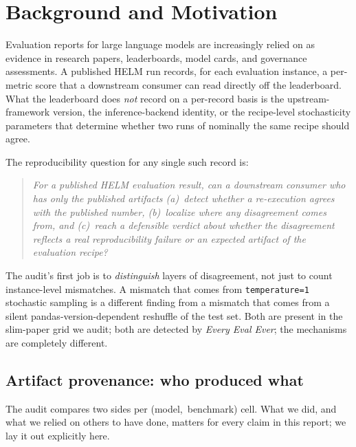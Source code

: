 \documentclass[11pt]{article}
\newcommand{\eee}{\textit{Every Eval Ever}\xspace}
\begin{document}
\section{Background and Motivation}
\label{sec:tr-background}

Evaluation reports for large language models are increasingly relied
  on as evidence in research papers, leaderboards, model cards, and
  governance assessments.
A published HELM run records, for each evaluation instance, a
  per-metric score that a downstream consumer can read directly off
  the leaderboard.
What the leaderboard does \emph{not} record on a per-record basis is
  the upstream-framework version, the inference-backend identity, or
  the recipe-level stochasticity parameters that determine whether
  two runs of nominally the same recipe should agree.

The reproducibility question for any single such record is:

\begin{quote}\itshape
For a published HELM evaluation result, can a downstream consumer who
  has only the published artifacts (a)~detect whether a re-execution
  agrees with the published number, (b)~localize where any
  disagreement comes from, and (c)~reach a defensible verdict about
  whether the disagreement reflects a real reproducibility failure or
  an expected artifact of the evaluation recipe?
\end{quote}

The audit's first job is to \emph{distinguish} layers of disagreement,
  not just to count instance-level mismatches.
A mismatch that comes from \texttt{temperature=1} stochastic sampling
  is a different finding from a mismatch that comes from a silent
  pandas-version-dependent reshuffle of the test set.
Both are present in the slim-paper grid we audit; both are detected
  by \eee{}; the mechanisms are completely different.

\subsection{Artifact provenance: who produced what}
\label{sec:tr-artifact-provenance}

The audit compares two sides per \mbox{(model, benchmark)} cell.
What we did, and what we relied on others to have done, matters for
  every claim in this report; we lay it out explicitly here.
\end{document}
